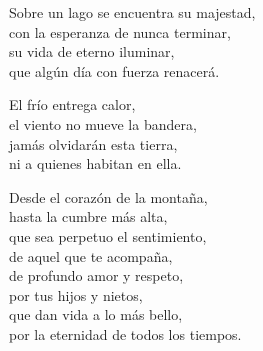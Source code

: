 \begin{center}
\vspace{1em} 
Sobre un lago se encuentra su majestad,\\ 
con la esperanza de nunca terminar,\\ 
su vida de eterno iluminar,\\ 
que algún día con fuerza renacerá.

\vspace{1em} 
El frío entrega calor,\\ 
el viento no mueve la bandera,\\ 
jamás olvidarán esta tierra,\\ 
ni a quienes habitan en ella.

\vspace{1em} 
Desde el corazón de la montaña,\\ 
hasta la cumbre más alta,\\ 
que sea perpetuo el sentimiento,\\ 
de aquel que te acompaña,\\ 
de profundo amor y respeto,\\ 
por tus hijos y nietos,\\ 
que dan vida a lo más bello,\\ 
por la eternidad de todos los tiempos.


\end{center}




